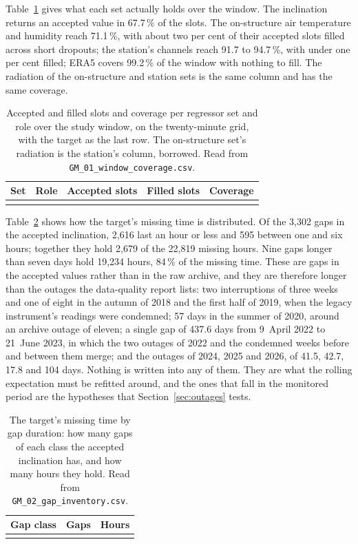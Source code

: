 \documentclass[11pt,a4paper]{article}
\begin{document}
Table~\ref{tab:coverage} gives what each set actually holds over the window.
The inclination returns an accepted value in 67.7\,\% of the slots. The
on-structure air temperature and humidity reach 71.1\,\%, with about two per
cent of their accepted slots filled across short dropouts; the station's
channels reach 91.7 to 94.7\,\%, with under one per cent filled; ERA5 covers
99.2\,\% of the window with nothing to fill. The radiation of the on-structure
and station sets is the same column and has the same coverage.

\begin{table}[H]
\centering
\caption{Accepted and filled slots and coverage per regressor set and role over
the study window, on the twenty-minute grid, with the target as the last row.
The on-structure set's radiation is the station's column, borrowed. Read from
\texttt{GM\_01\_window\_coverage.csv}.}
\label{tab:coverage}
\begin{tabular}{llrrr}
\toprule
Set & Role & Accepted slots & Filled slots & Coverage \\
\midrule
\\
\bottomrule
\end{tabular}
\end{table}

Table~\ref{tab:gapclasses} shows how the target's missing time is distributed.
Of the 3,302 gaps in the accepted inclination, 2,616 last an hour or less and
595 between one and six hours; together they hold 2,679 of the 22,819 missing
hours. Nine gaps longer than seven days hold 19,234 hours, 84\,\% of the
missing time. These are gaps in the accepted values rather than in the raw
archive, and they are therefore longer than the outages the data-quality
report lists: two interruptions of three weeks and one of eight in the autumn
of 2018 and the first half of 2019, when the legacy instrument's readings were
condemned; 57 days in the summer of 2020, around an archive outage of eleven;
a single gap of 437.6 days from 9~April 2022 to 21~June 2023, in which the two
outages of 2022 and the condemned weeks before and between them merge; and the
outages of 2024, 2025 and 2026, of 41.5, 42.7, 17.8 and 104 days. Nothing is
written into any of them. They are what the rolling expectation must be
refitted around, and the ones that fall in the monitored period are the
hypotheses that Section~\ref{sec:outages} tests.

\begin{table}[H]
\centering
\caption{The target's missing time by gap duration: how many gaps of each class
the accepted inclination has, and how many hours they hold. Read from
\texttt{GM\_02\_gap\_inventory.csv}.}
\label{tab:gapclasses}
\begin{tabular}{lrr}
\toprule
Gap class & Gaps & Hours \\
\midrule
\\
\bottomrule
\end{tabular}
\end{table}
\end{document}

